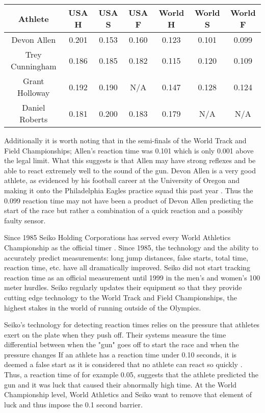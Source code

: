 \documentclass[12pt, letterpaper, titlepage]{article}
\begin{document}

\begin{center}
\begin{tabular}{||c | c c c | c c c||} 
 \hline
 Athlete & USA H & USA S & USA F & World H & World S & World F \\ [0.5ex] 
 \hline\hline
 Devon Allen & 0.201 & 0.153 & 0.160 & 0.123 & 0.101 & 0.099 \\ 
 \hline
 Trey Cunningham & 0.186 & 0.185 & 0.182 & 0.115 & 0.120 & 0.109 \\
 \hline
 Grant Holloway & 0.192 & 0.190 & N/A & 0.147 & 0.128 & 0.124 \\
 \hline
 Daniel Roberts & 0.181 & 0.200 & 0.183 & 0.179 & N/A & N/A \\ [0.5ex]
 \hline
\end{tabular}
\end{center}


Additionally it is worth noting that in the semi-finals of the World Track and
Field Championships; Allen's reaction time was 0.101 which is only 0.001 above
the legal limit.  What this suggests is that Allen may have strong reflexes
and be able to react extremely well to the sound of the gun.  Devon Allen is a
very good athlete, as evidenced by his football career at the University of Oregon
and making it onto the Philadelphia Eagles practice squad this past year \citep{Hurley}.
Thus the 0.099 reaction time may not have been a product of Devon Allen
predicting the start of the race but rather a combination of a quick reaction 
and a possibly faulty sensor.

Since 1985 Seiko Holding Corporations has served every World Athletics Championship
as the official timer \citep{Seiko}.  Since 1985, the technology and the ability
to accurately predict measurements: long jump distances, false starts, total time,
reaction time, etc. have all dramatically improved.  Seiko did not start tracking
reaction time as an official measurement until 1999 in the men's and women's 100 meter
hurdles.  Seiko regularly updates their equipment so that they provide cutting edge
technology to the World Track and Field Championships, the highest stakes in the world
of running outside of the Olympics.

Seiko's technology for detecting reaction times relies on the pressure that athletes
exert on the plate when they push off.  Their systems measure the time differential
between when the "gun" goes off to start the race and when the pressure changes 
\citep{Seiko}  If an athlete has a reaction time under 0.10 seconds, it is deemed a 
false start as it is considered that no athlete can react so quickly \citep{Seiko-Timing}.  
Thus, a reaction time of for example 0.05, suggests that the athlete predicted the gun and it
was luck that caused their abnormally high time.  At the World Championship level,
World Athletics and Seiko want to remove that element of luck and thus impose the 0.1
second barrier.
\end{document}
